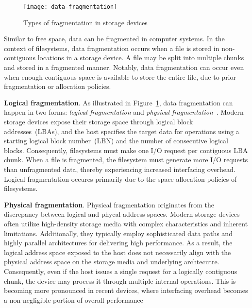 \begin{figure}
    \centering
    \texttt{[image: data-fragmentation]}
	\caption{Types of fragmentation in storage devices
	}
    \label{fig:data-fragmentation}
\end{figure}

Similar to free space, data can be fragmented in computer systems.
In the context of filesystems, data fragmentation occurs when a file is stored in non-contiguous locations in a storage device.
A file may be split into multiple chunks and stored in a fragmented manner.
Notably, data fragmentation can occur even when enough contiguous space is available to store the entire file, due to prior fragmentation or allocation policies.

\textbf{Logical fragmentation}.
As illustrated in Figure~\ref{fig:data-fragmentation}, data fragmentation can happen in two forms: \emph{logical fragmentation} and \emph{physical fragmentation}~\cite{janusd:atc17}.
Modern storage devices expose their storage space through logical block addresses~(LBAs), and the host specifies the target data for operations using a starting logical block number~(LBN) and the number of consecutive logical blocks.
Consequently, filesystems must make one I/O request per contiguous LBA chunk.
When a file is fragmented, the filesystem must generate more I/O requests than unfragmented data, thereby experiencing increased interfacing overhead.
Logical fragmentation occures primarily due to the space allocation policies of filesystems.

\textbf{Physical fragmentation}.
Physical fragmentation originates from the discrepancy between logical and phycal address spaces.
Modern storage devices often utilize high-density storage media with complex characteristics and inherent limitations.
Additionally, they typically employ sophisticated data paths and highly parallel architectures for delivering high performance.
As a result, the logical address space exposed to the host does not necessarily align with the physical address space on the storage media and underlying archtecutre.
Consequently, even if the host issues a single request for a logically contiguous chunk, the device may process it through multiple internal operations.
This is becoming more pronounced in recent devices, where interfacing overhead becomes a non-negligible portion of overall performance~\cite{Problem_in_SSD_Empirical,senescence:fast17,Problem_in_SSD_Mobile_Devices,survey:ictc23,no-afraid:fast24,defrag-mobile:atc17,fragpicker:sosp21}

